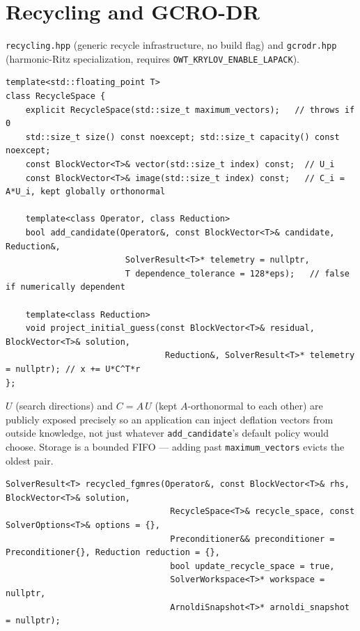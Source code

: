\documentclass[11pt,a4paper]{report}
\begin{document}
\section{Recycling and GCRO-DR}
\label{sec:5.7}

\texttt{recycling.hpp} (generic recycle infrastructure, no build flag)
and \texttt{gcrodr.hpp} (harmonic-Ritz specialization, requires
\lstinline!OWT_KRYLOV_ENABLE_LAPACK!).

\begin{lstlisting}
template<std::floating_point T>
class RecycleSpace {
    explicit RecycleSpace(std::size_t maximum_vectors);   // throws if 0
    std::size_t size() const noexcept; std::size_t capacity() const noexcept;
    const BlockVector<T>& vector(std::size_t index) const;  // U_i
    const BlockVector<T>& image(std::size_t index) const;   // C_i = A*U_i, kept globally orthonormal

    template<class Operator, class Reduction>
    bool add_candidate(Operator&, const BlockVector<T>& candidate, Reduction&,
                        SolverResult<T>* telemetry = nullptr,
                        T dependence_tolerance = 128*eps);   // false if numerically dependent

    template<class Reduction>
    void project_initial_guess(const BlockVector<T>& residual, BlockVector<T>& solution,
                                Reduction&, SolverResult<T>* telemetry = nullptr); // x += U*C^T*r
};
\end{lstlisting}

$U$ (search directions) and $C = A\,U$ (kept $A$-orthonormal to each
other) are publicly exposed precisely so an application can inject
deflation vectors from outside knowledge, not just whatever
\lstinline!add_candidate!'s default policy would choose. Storage is a bounded
FIFO --- adding past \lstinline!maximum_vectors! evicts the oldest pair.

\begin{lstlisting}
SolverResult<T> recycled_fgmres(Operator&, const BlockVector<T>& rhs, BlockVector<T>& solution,
                                 RecycleSpace<T>& recycle_space, const SolverOptions<T>& options = {},
                                 Preconditioner&& preconditioner = Preconditioner{}, Reduction reduction = {},
                                 bool update_recycle_space = true,
                                 SolverWorkspace<T>* workspace = nullptr,
                                 ArnoldiSnapshot<T>* arnoldi_snapshot = nullptr);
\end{lstlisting}
\end{document}
